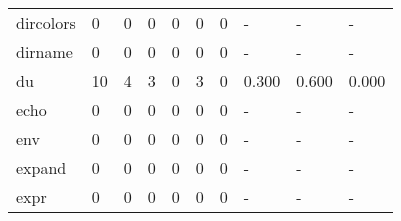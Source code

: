 \begin{longtable}{lp{1.3cm}p{1.3cm}p{1.3cm}p{1.3cm}p{1.3cm}p{1.3cm}p{1.3cm}p{1.3cm}p{1.3cm}}
dircolors &                      0 &                                  0 &                                 0 &                                0 &                                 0 &                               0 &                                    - &                                      - &                                    - \\
dirname   &                      0 &                                  0 &                                 0 &                                0 &                                 0 &                               0 &                                    - &                                      - &                                    - \\
du        &                     10 &                                  4 &                                 3 &                                0 &                                 3 &                               0 &                                0.300 &                                  0.600 &                                0.000 \\
echo      &                      0 &                                  0 &                                 0 &                                0 &                                 0 &                               0 &                                    - &                                      - &                                    - \\
env       &                      0 &                                  0 &                                 0 &                                0 &                                 0 &                               0 &                                    - &                                      - &                                    - \\
expand    &                      0 &                                  0 &                                 0 &                                0 &                                 0 &                               0 &                                    - &                                      - &                                    - \\
expr      &                      0 &                                  0 &                                 0 &                                0 &                                 0 &                               0 &                                    - &                                      - &                                    - \\

\end{longtable}
